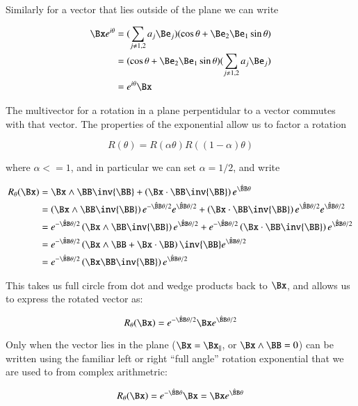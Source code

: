 Similarly for a vector that lies outside of the plane we can write

\begin{align*}
\Bx e^{i\theta} 
&= (\sum_{j \ne 1,2} a_j \Be_j)(\cos\theta + \Be_2 \Be_1\sin\theta) \\
&= (\cos\theta + \Be_2 \Be_1\sin\theta) (\sum_{j \ne 1,2} a_j \Be_j) \\
&= e^{i\theta}\Bx
\end{align*}

The multivector for a rotation in a plane perpentidular to a vector commutes with that vector.  The properties of the 
exponential allow us to factor a rotation

\[
R(\theta) = R(\alpha\theta) R((1-\alpha)\theta)
\]

where $\alpha <= 1$, and in particular we can set $\alpha = 1/2$, and write

\begin{align*}
R_\theta(\Bx) 
&= \Bx \wedge \BB \inv{\BB} + \left(\Bx \cdot \BB \inv{\BB}\right)e^{\hat{\BB}\theta} \\
&= \left(\Bx \wedge \BB \inv{\BB}\right) e^{-\hat{\BB}\theta/2} e^{\hat{\BB}\theta/2} 
 + \left(\Bx \cdot \BB \inv{\BB} \right) e^{\hat{\BB}\theta/2} e^{\hat{\BB}\theta/2} \\
&= e^{-\hat{\BB}\theta/2} \left(\Bx \wedge \BB \inv{\BB}\right) e^{\hat{\BB}\theta/2}  
+ e^{-\hat{\BB}\theta/2} \left(\Bx \cdot \BB \inv{\BB}\right)e^{\hat{\BB}\theta/2} \\
&= e^{-\hat{\BB}\theta/2} \left(\Bx \wedge \BB + \Bx \cdot \BB\right) \inv{\BB} e^{\hat{\BB}\theta/2} \\
&= e^{-\hat{\BB}\theta/2} \left(\Bx \BB \inv{\BB} \right) e^{\hat{\BB}\theta/2}  
\end{align*}

This takes us full circle from dot and wedge products back to $\Bx$, and allows us to express the rotated vector as:

\begin{equation}\label{eqn:rotor:rotor}
R_\theta(\Bx) 
= e^{-\hat{\BB}\theta/2} \Bx e^{\hat{\BB}\theta/2}
\end{equation}

Only when the vector lies in the plane ($\Bx = \Bx_\parallel$, or $\Bx \wedge \BB = 0$) can be written using the familiar left or right ``full angle'' rotation exponential that we are used to from complex arithmetric:

\[
R_\theta(\Bx) = e^{-\hat{\BB}\theta} \Bx = \Bx e^{\hat{\BB}\theta}
\]

